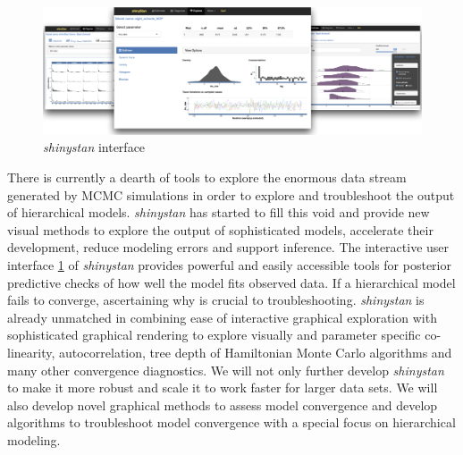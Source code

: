 \documentclass[11pt,notitlepage]{article}
\begin{document}
\begin{figure}
  \vspace{-10pt}
 \includegraphics[scale=1.2]{Figures/shinystan.png}
  \vspace{-12pt}
  \caption{\textit{shinystan} interface}
    \label{fig:shinystan}
 \vspace{- 14pt}
\end{figure}

There is currently a dearth of tools to explore the enormous data stream 
generated by MCMC simulations in order to explore and troubleshoot the output of hierarchical models. 
\textit{shinystan} has started to fill this void and provide new visual methods to explore the output 
of sophisticated models, accelerate their development, reduce modeling errors and support inference. 
The interactive user interface \ref{fig:shinystan} of \textit{shinystan} 
provides powerful and easily accessible tools for posterior predictive checks 
of how well the model fits observed data. If a hierarchical 
model fails to converge, ascertaining why is crucial to troubleshooting. \textit{shinystan} 
is already unmatched in combining ease of interactive graphical exploration 
with sophisticated graphical rendering to explore visually and parameter 
specific co-linearity, autocorrelation, tree depth of Hamiltonian Monte 
Carlo algorithms and many other convergence diagnostics. We will not only 
further develop \textit{shinystan} to make it more robust and scale it to work 
faster for larger data sets. We will also develop novel graphical 
methods to assess model convergence and develop algorithms to 
troubleshoot model convergence with a special focus on hierarchical modeling.
\end{document}

